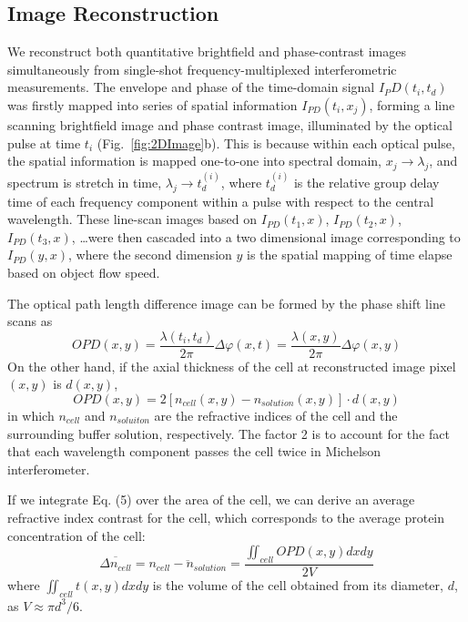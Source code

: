 \documentclass[aps,pra,preprint,superscriptaddress]{revtex4-1}
\begin{document}
\subsection{Image Reconstruction}

We reconstruct both quantitative brightfield and phase-contrast images simultaneously from single-shot frequency-multiplexed interferometric measurements. The envelope and phase of the time-domain signal $I_PD (t_i,t_d)$ was firstly mapped into series of spatial information $I_{PD}(t_i,x_j)$, forming a line scanning brightfield image and phase contrast image, illuminated by the optical pulse at time $t_i$ (Fig.~\ref{fig:2DImage}b). This is because within each optical pulse, the spatial information is mapped one-to-one into spectral domain, $x_j \rightarrow \lambda_j$, and spectrum is stretch in time, $\lambda_j \rightarrow t_d^{(i)}$, where $t_d^{(i)}$ is the relative group delay time of each frequency component within a pulse with respect to the central wavelength. These line-scan images based on $I_{PD}(t_1,x)$, $I_{PD} (t_2,x)$, $I_{PD} (t_3,x)$, \ldots were then cascaded into a two dimensional image corresponding to $I_{PD}(y,x)$, where the second dimension $y$ is the spatial mapping of time elapse based on object flow speed. 

The optical path length difference image can be formed by the phase shift line scans as
\begin{equation}
OPD(x,y) = \frac{\lambda(t_i,t_d)}{2\pi} \Delta\varphi(x,t) = \frac{\lambda(x,y)}{2π} \Delta\varphi(x,y)
\end{equation}
On the other hand, if the axial thickness of the cell at reconstructed image pixel $(x,y)$ is $d(x,y)$,
\begin{equation}
OPD(x,y) = 2 [n_{cell}(x,y) - n_{solution}(x,y)] \cdot d(x,y)
\end{equation}
in which $n_{cell}$ and $n_{soluiton}$ are the refractive indices of the cell and the surrounding buffer solution, respectively. The factor 2 is to account for the fact that each wavelength component passes the cell twice in Michelson interferometer. 

If we integrate Eq. (5) over the area of the cell, we can derive an average refractive index contrast for the cell, which corresponds to the average protein concentration of the cell:
\begin{equation}
\overline{\Delta n_{cell}} = \overline{n_{cell} - n_{solution}} = \frac{\iint_{cell} OPD(x,y) dx dy}{2 V}
\end{equation}
where $\iint_{cell} t(x,y) dx dy$ is the volume of the cell obtained from its diameter, $d$, as $V \approx \pi d^3/6$. 
\end{document}
